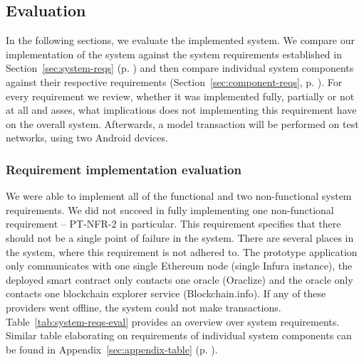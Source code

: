 \subsection{Evaluation}\label{sec:evaluation}

In the following sections, we evaluate the implemented system. We compare our implementation of the system against the system requirements established in Section~\ref{sec:system-reqs} (p. \pageref{sec:system-reqs}) and then compare individual system components against their respective requirements (Section~\ref{sec:component-reqs}, p. \pageref{sec:component-reqs}). For every requirement we review, whether it was implemented fully, partially or not at all and asses, what implications does not implementing this requirement have on the overall system. Afterwards, a model transaction will be performed on test networks, using two Android devices.

\subsubsection{Requirement implementation evaluation}

We were able to implement all of the functional and two non-functional system requirements. We did not succeed in fully implementing one non-functional requirement -- PT-NFR-2 in particular. This requirement specifies that there should not be a single point of failure in the system. There are several places in the system, where this requirement is not adhered to. The prototype application only communicates with one single Ethereum node (single Infura instance), the deployed smart contract only contacts one oracle (Oraclize) and the oracle only contacts one blockchain explorer service (Blockchain.info). If any of these providers went offline, the system could not make transactions. Table~\ref{tab:system-reqs-eval} provides an overview over system requirements. Similar table elaborating on requirements of individual system components can be found in Appendix~\ref{sec:appendix-table} (p. \pageref{sec:appendix-table}).


